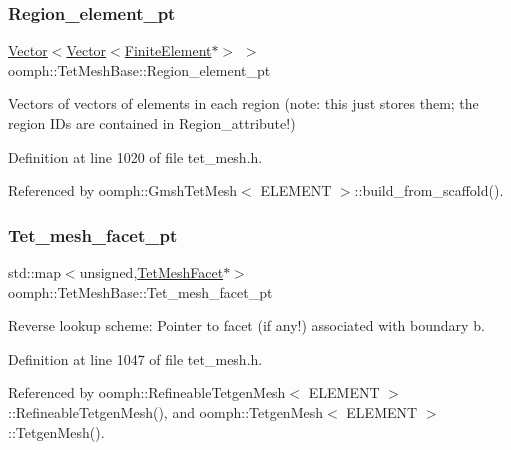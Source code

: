 \subsubsection{\texorpdfstring{Region\+\_\+element\+\_\+pt}{Region\_element\_pt}}
{\footnotesize\ttfamily \hyperlink{classoomph_1_1Vector}{Vector}$<$\hyperlink{classoomph_1_1Vector}{Vector}$<$\hyperlink{classoomph_1_1FiniteElement}{Finite\+Element}$\ast$$>$ $>$ oomph\+::\+Tet\+Mesh\+Base\+::\+Region\+\_\+element\+\_\+pt\hspace{0.3cm}{\ttfamily [protected]}}



Vectors of vectors of elements in each region (note\+: this just stores them; the region I\+Ds are contained in Region\+\_\+attribute!) 



Definition at line 1020 of file tet\+\_\+mesh.\+h.



Referenced by oomph\+::\+Gmsh\+Tet\+Mesh$<$ E\+L\+E\+M\+E\+N\+T $>$\+::build\+\_\+from\+\_\+scaffold().

\mbox{\label{classoomph_1_1TetMeshBase_a31eb99c38149fd9038cfb4f383cfa252}} 
\subsubsection{\texorpdfstring{Tet\+\_\+mesh\+\_\+facet\+\_\+pt}{Tet\_mesh\_facet\_pt}}
{\footnotesize\ttfamily std\+::map$<$unsigned,\hyperlink{classoomph_1_1TetMeshFacet}{Tet\+Mesh\+Facet}$\ast$$>$ oomph\+::\+Tet\+Mesh\+Base\+::\+Tet\+\_\+mesh\+\_\+facet\+\_\+pt\hspace{0.3cm}{\ttfamily [protected]}}



Reverse lookup scheme\+: Pointer to facet (if any!) associated with boundary b. 



Definition at line 1047 of file tet\+\_\+mesh.\+h.



Referenced by oomph\+::\+Refineable\+Tetgen\+Mesh$<$ E\+L\+E\+M\+E\+N\+T $>$\+::\+Refineable\+Tetgen\+Mesh(), and oomph\+::\+Tetgen\+Mesh$<$ E\+L\+E\+M\+E\+N\+T $>$\+::\+Tetgen\+Mesh().

